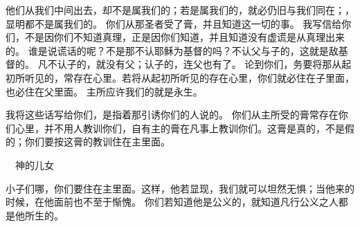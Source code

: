 {他们从我们中间出去，却不是属我们的；若是属我们的，就必仍旧与我们同在；{}，显明都不是属我们的。
你们从那圣者受了{}膏，并且知道这一切的事。
我写信给你们，不是因你们不知道真理，正是因你们知道，并且知道没有虚谎是从真理出来的。
谁是说谎话的呢？不是那不认耶稣为基督的吗？不认父与子的，这就是敌基督的。
凡不认子的，就没有父；认子的，连父也有了。
论到你们，务要将那从起初所听见的，常存在心里。若将从起初所听见的存在心里，你们就必住在子里面，也必住在父里面。
主所应许我们的就是永生。
\par }{\PP {}我将这些话写给你们，是指着那引诱你们的人说的。
你们从主所受的{}膏常存在你们心里，并不用人教训你们，自有主的{}膏在凡事上教训你们。这{}膏是真的，不是假的；你们要按这{}膏的教训住在主里面。
\par }{\SH 　神的儿女
\par }{\PP {}小子们哪，你们要住在主里面。这样，他若显现，我们就可以坦然无惧；当他来的时候，在他面前也不至于惭愧。
你们若知道他是公义的，就知道凡行公义之人都是他所生的。

}
